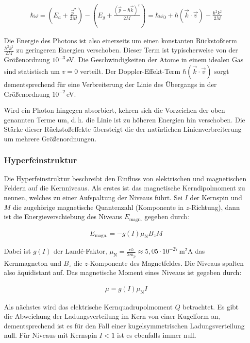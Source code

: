 \documentclass[
a4paper,                %
titlepage=firstiscover, %
captions=tableheading,  %
toc=bibliography,       %
toc=listof,             %
oneside,                %
automark,               %
12pt,                   %
english, ngerman,       %
parskip = half,         %
]{scrartcl}
\begin{document}
\begin{align}
\hbar \omega = \left( E_a + \frac{\vec{p}^2}{2M}\right)  - \left( E_g  + \frac{\left( \vec{p}-\hbar \vec{k}\right) ^2}{2M}\right) = \hbar\omega_0 + \hbar\left( \vec{k} \cdot \vec{v}\right) -\frac{\hbar^2k^2}{2M}
\end{align}

\noindent Die Energie des Photons ist also einerseits um einen konstanten Rückstoßterm $\frac{\hbar^2k^2}{2M}$ zu geringeren Energien verschoben.
Dieser Term ist typischerweise von der Größenordnung $10^{-3}\,$eV.
Die Geschwindigkeiten der Atome in einem idealen Gas sind statistisch um $v=0$ verteilt.
Der Doppler-Effekt-Term $\hbar\left( \vec{k} \cdot \vec{v}\right)$ sorgt dementsprechend für eine Verbreiterung der Linie des Übergangs in der Größenordnung $10^{-2}\,$eV. 

Wird ein Photon hingegen absorbiert, kehren sich die Vorzeichen der oben genannten Terme um, d.\,h. die Linie ist zu höheren Energien hin verschoben.
Die Stärke dieser Rückstoßeffekte übersteigt die der natürlichen Linienverbreiterung um mehrere Größenordnungen.


\subsubsection{Hyperfeinstruktur}

Die Hyperfeinstruktur beschreibt den Einfluss von elektrischen und magnetischen Feldern auf die Kernniveaus.
Als erstes ist das magnetische Kerndipolmoment zu nennen, welches zu einer Aufspaltung der Niveaus führt.
Sei $I$ der Kernspin und $M$ die zugehörige magnetische Quantenzahl (Komponente in $z$-Richtung), dann ist die Energieverschiebung des Niveaus $E_\text{magn.}$ gegeben durch:

\begin{align}
E_\text{magn.}=-g(I)\mu_\text{N}B_z M
\end{align}

\noindent Dabei ist $g(I)$ der Land\'{e}-Faktor, $\mu_\text{N}=\frac{e\hbar}{2m_p}\approx 5,05\cdot 10^{-27}\,$m$^2$A das Kernmagneton und $B_z$ die $z$-Komponente des Magnetfeldes.
Die Niveaus spalten also äquidistant auf.
Das magnetische Moment eines Niveaus ist gegeben durch:

\begin{align}
\mu = g(I)\mu_\text{N}I
\end{align}

\noindent Als nächstes wird das elektrische Kernquadrupolmoment $Q$ betrachtet.
Es gibt die Abweichung der Ladungsverteilung im Kern von einer Kugelform an, dementsprechend ist es für den Fall einer kugelsymmetrischen Ladungsverteilung null.
Für Niveaus mit Kernspin $I<1$ ist es ebenfalls immer null.
\end{document}
